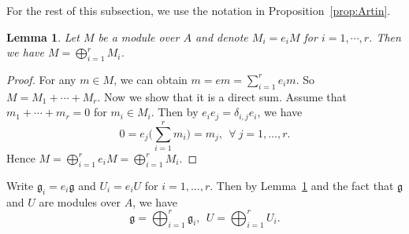 \documentclass[12pt]{article}
\numberwithin{equation}{section}
\newtheorem{lemma}[theorem]{Lemma}
\theoremstyle{definition}
\theoremstyle{plain}
\newcommand{\fg}{\mathfrak{g}}
\begin{document}
For the rest of this subsection, we use the notation in Proposition~\ref{prop:Artin}.
\begin{lemma}\label{lem:M_i}
    Let $M$ be a module over $A$ and denote $M_i=e_iM$ for $i=1,\cdots,r$. Then we have $M=\bigoplus_{i=1}^rM_i$.
\end{lemma}
\begin{proof}
    For any $m\in M$, we can obtain $m=em=\sum_{i=1}^re_im$. So $M=M_1+\cdots+M_r$. Now we show that it is a direct sum. Assume that $m_1+\cdots+m_r=0$ for $m_i\in M_i$. Then by $e_ie_j=\delta_{i,j}e_i$, we have 
    \begin{equation*}
        0=e_j\big(\sum_{i=1}^rm_i\big)=m_j,\ \ \forall\ j=1,\dots,r.
    \end{equation*}
    Hence $M=\bigoplus_{i=1}^re_iM=\bigoplus_{i=1}^rM_i$.
\end{proof}

Write $\fg_i=e_i\fg$ and $U_i=e_iU$ for $i=1,\dots,r$. Then by Lemma~\ref{lem:M_i} and the fact that $\fg$ and $U$ are modules over $A$, we have
\begin{equation}\label{g_iU_i}
    \fg=\bigoplus_{i=1}^r\fg_i,\ \ U=\bigoplus_{i=1}^r U_i.
\end{equation}
\end{document}
